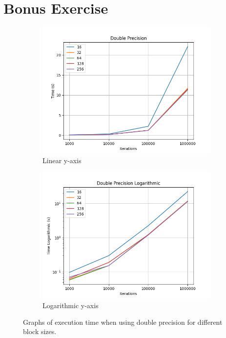 \documentclass[a4paper, 12pt]{article}
\begin{document}
\newpage
\section{Bonus Exercise}

\begin{figure}
  \centering
  \begin{subfigure}{.5\textwidth}
    \centering
    \includegraphics[width=1\linewidth]{graphs/ex_bonus_double.png}
    \caption{Linear y-axis}
    \label{fig:ex-bonus-double-linear}
  \end{subfigure}%
  \begin{subfigure}{.5\textwidth}
    \centering
    \includegraphics[width=1\linewidth]{graphs/ex_bonus_double_log.png}
    \caption{Logarithmic y-axis}
    \label{fig:fig:ex-bonus-double-log}
  \end{subfigure}
  \caption{Graphs of execution time when using double precision for different block sizes.}
  \label{fig:fig:ex-bonus-double}
\end{figure}
\end{document}
